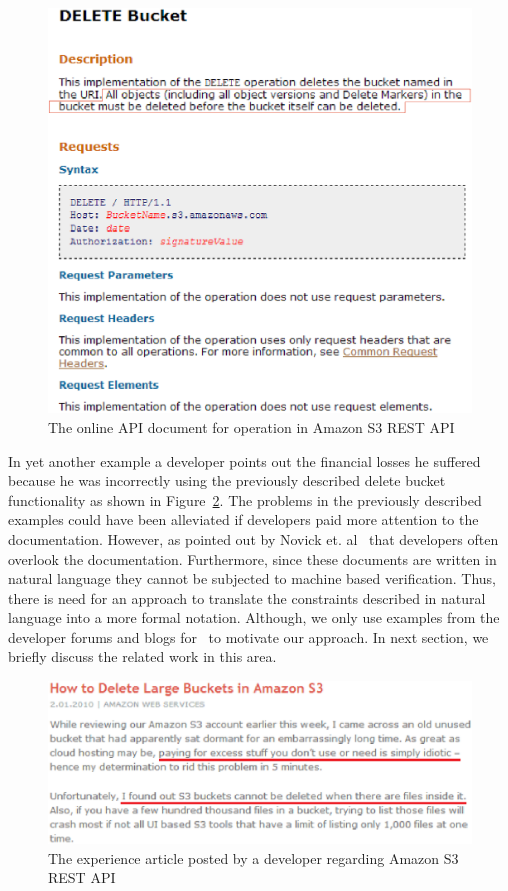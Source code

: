 \begin{figure}[t]
\begin{center}
\includegraphics[scale=0.4]{AmzonS3DeleteBucketAPI.eps}
\end{center}
\caption{\label{fig:AmzonS3DeleteBucketAPI} The online API document for  operation in Amazon S3 REST API}
\end{figure}


In yet another example a developer points out the financial losses he suffered because he was incorrectly using the previously described delete bucket functionality as shown in Figure~\ref{fig:example2}. The problems in the previously described examples could have been alleviated if developers paid more attention to the documentation. However, as pointed out by Novick et. al~\cite{Novick2006WDP} that developers often overlook the documentation. Furthermore, since these documents are written in natural language they cannot be subjected to machine based verification. Thus, there is need for an approach to translate the constraints described in natural language into a more formal notation. Although, we only use examples from the developer forums and blogs for \amazon\ to motivate our approach. In next section, we briefly discuss the related work in this area.


\begin{figure}[t]
\begin{center}
\includegraphics[scale=0.4]{Example2.eps}
\end{center}
\caption{\label{fig:example2} The experience article posted by a developer regarding Amazon S3 REST API}
\end{figure}


 








